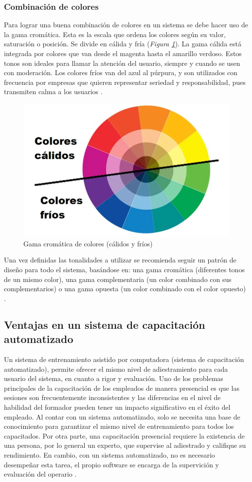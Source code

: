 \subsubsection{Combinación de colores}
Para lograr una buena combinación de colores en un sistema se debe hacer uso de la gama cromática. Esta es la escala que ordena los colores según su valor, saturación o posición. Se divide en cálida y fría (\textsl{Figura \ref{fig:colores}}). La gama cálida está integrada por colores que van desde el magenta hasta el amarillo verdoso. Estos tonos son ideales para llamar la atención del usuario, siempre y cuando se usen con moderación. Los colores fríos van del azul al púrpura, y son utilizados con frecuencia por empresas que quieren representar seriedad y responsabilidad, pues transmiten calma a los usuarios \cite{TerronLopez2022} .

\begin{figure}[h]
\centering
 \includegraphics[width=0.6\linewidth]{imagen/gama.png}
 \caption{Gama cromática de colores (cálidos y fríos)}
 \label{fig:colores} 
\end{figure}

Una vez definidas las tonalidades a utilizar se recomienda seguir un patrón de diseño para todo el sistema, basándose en: una gama cromática (diferentes tonos de un mismo color), una gama complementaria (un color combinado con sus complementarios) o una gama opuesta (un color combinado con el color opuesto) \cite{TerronLopez2022}.

\subsection{Ventajas en un sistema de capacitación automatizado}
Un sistema de entrenamiento asistido por computadora (sistema de capacitación automatizado), permite ofrecer el mismo nivel de adiestramiento para cada usuario del sistema, en cuanto a rigor y evaluación. Uno de los problemas principales de la capacitación de los empleados de manera presencial es que las sesiones son frecuentemente inconsistentes y las diferencias en el nivel de habilidad del formador pueden tener un impacto significativo en el éxito del empleado. Al contar con un sistema automatizado, solo se necesita una base de conocimiento para garantizar el mismo nivel de entrenamiento para todos los capacitados. Por otra parte, una capacitación presencial requiere la existencia de una persona, por lo general un experto, que supervise al adiestrado y califique su rendimiento. En cambio, con un sistema automatizado, no es necesario desempeñar esta tarea, el propio software se encarga de la supervición y evaluación del operario \cite{Kanev2017}.

